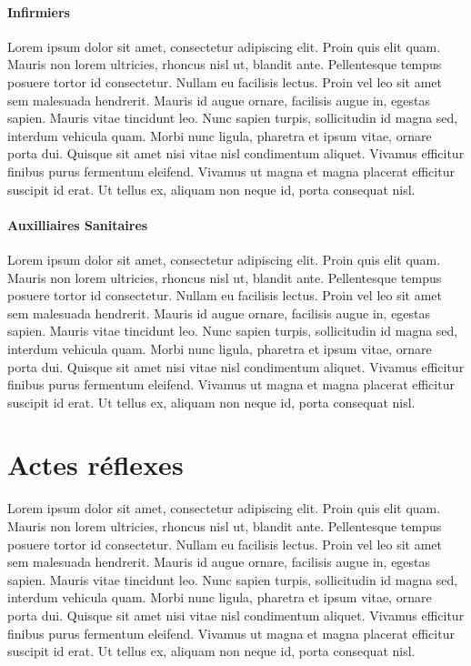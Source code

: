 \documentclass{article}
\begin{document}
			\subsection{Infirmiers}
				Lorem ipsum dolor sit amet, consectetur adipiscing elit. Proin quis elit quam. Mauris non lorem ultricies, rhoncus nisl ut, blandit ante. Pellentesque tempus posuere tortor id consectetur. Nullam eu facilisis lectus. Proin vel leo sit amet sem malesuada hendrerit. Mauris id augue ornare, facilisis augue in, egestas sapien. Mauris vitae tincidunt leo. Nunc sapien turpis, sollicitudin id magna sed, interdum vehicula quam. Morbi nunc ligula, pharetra et ipsum vitae, ornare porta dui. Quisque sit amet nisi vitae nisl condimentum aliquet. Vivamus efficitur finibus purus fermentum eleifend. Vivamus ut magna et magna placerat efficitur suscipit id erat. Ut tellus ex, aliquam non neque id, porta consequat nisl.
			
			\subsection{Auxilliaires Sanitaires}
				Lorem ipsum dolor sit amet, consectetur adipiscing elit. Proin quis elit quam. Mauris non lorem ultricies, rhoncus nisl ut, blandit ante. Pellentesque tempus posuere tortor id consectetur. Nullam eu facilisis lectus. Proin vel leo sit amet sem malesuada hendrerit. Mauris id augue ornare, facilisis augue in, egestas sapien. Mauris vitae tincidunt leo. Nunc sapien turpis, sollicitudin id magna sed, interdum vehicula quam. Morbi nunc ligula, pharetra et ipsum vitae, ornare porta dui. Quisque sit amet nisi vitae nisl condimentum aliquet. Vivamus efficitur finibus purus fermentum eleifend. Vivamus ut magna et magna placerat efficitur suscipit id erat. Ut tellus ex, aliquam non neque id, porta consequat nisl.
	
	\part{Actes réflexes}
		Lorem ipsum dolor sit amet, consectetur adipiscing elit. Proin quis elit quam. Mauris non lorem ultricies, rhoncus nisl ut, blandit ante. Pellentesque tempus posuere tortor id consectetur. Nullam eu facilisis lectus. Proin vel leo sit amet sem malesuada hendrerit. Mauris id augue ornare, facilisis augue in, egestas sapien. Mauris vitae tincidunt leo. Nunc sapien turpis, sollicitudin id magna sed, interdum vehicula quam. Morbi nunc ligula, pharetra et ipsum vitae, ornare porta dui. Quisque sit amet nisi vitae nisl condimentum aliquet. Vivamus efficitur finibus purus fermentum eleifend. Vivamus ut magna et magna placerat efficitur suscipit id erat. Ut tellus ex, aliquam non neque id, porta consequat nisl.
		
\end{document}
